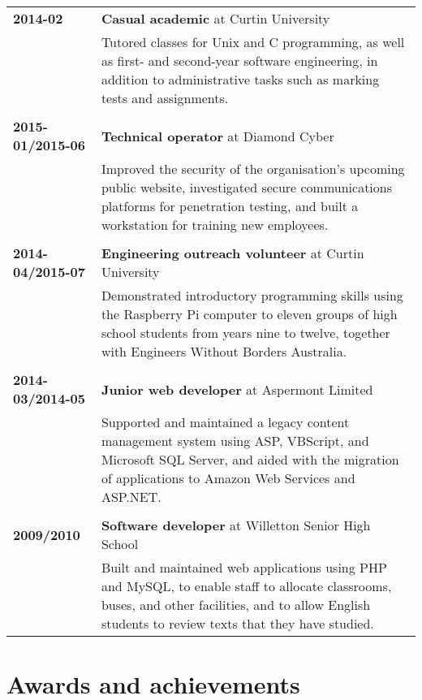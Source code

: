 \documentclass[a4paper,12pt]{article}
\begin{document}
\begin{tabular}{p{3.5cm}p{12.5cm}}
	\textbf{2014-02} &
		\textbf{Casual academic} at Curtin University\\ &
		Tutored classes for Unix and C programming, as well as
		first- and second-year software engineering, in
		addition to administrative tasks such as marking tests
		and assignments.\\\\
	\textbf{2015-01/2015-06} &
		\textbf{Technical operator} at Diamond Cyber\\ &
		Improved the security of the organisation's upcoming public
		website, investigated secure communications platforms for
		penetration testing, and built a workstation for training new
		employees.\\\\
	\textbf{2014-04/2015-07} &
		\textbf{Engineering outreach volunteer} at Curtin University\\ &
		Demonstrated introductory programming skills using the
		Raspberry Pi computer to eleven groups of high school students
		from years nine to twelve, together with Engineers Without
		Borders Australia.\\\\
	\textbf{2014-03/2014-05} &
		\textbf{Junior web developer} at Aspermont Limited\\ &
		Supported and maintained a legacy content management system
		using ASP, VBScript, and Microsoft SQL Server, and aided
		with the migration of applications to Amazon Web Services and
		ASP.NET.\\\\
	\textbf{2009/2010} &
		\textbf{Software developer} at Willetton Senior High School\\ &
		Built and maintained web applications using PHP and MySQL, to
		enable staff to allocate classrooms, buses, and other
		facilities, and to allow English students to review texts that
		they have studied.\\
\end{tabular}

\section*{Awards and achievements}
\end{document}

